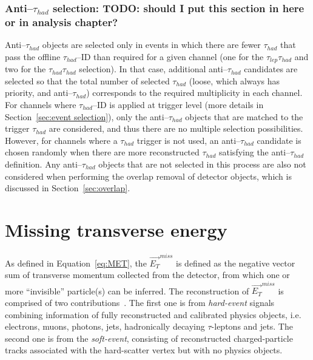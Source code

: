 \subsubsection{Anti--$\tau_{had}$ selection: TODO: should I put this section in here or in analysis chapter?}
Anti--$\tau_{had}$ objects are selected only in events 
in which there are fewer $\tau_{had}$ that pass the offline $\tau_{had}$--ID than
required for a given channel (one for the $\tau_{lep}\tau_{had}$ 
and two for the $\tau_{had}$$\tau_{had}$ selection). 
In that case, additional anti--$\tau_{had}$ candidates are selected 
so that the total number of selected $\tau_{had}$ (loose, which always has priority,
and anti--$\tau_{had}$) corresponds to the required multiplicity in each channel.
For channels where $\tau_{had}$--ID is applied at trigger level 
(more details in Section~\ref{sec:event selection}), 
only the anti--$\tau_{had}$ objects that are matched to the
trigger $\tau_{had}$ are considered, and thus there are 
no multiple selection possibilities. 
However, for channels where a $\tau_{had}$ trigger is not used, 
an anti--$\tau_{had}$ candidate is chosen randomly when there are more reconstructed
$\tau_{had}$ satisfying the anti--$\tau_{had}$ definition. 
Any anti--$\tau_{had}$ objects that are not selected in this process are also not
considered when performing the overlap removal of detector objects, 
which is discussed in Section~\ref{sec:overlap}.

\section{Missing transverse energy}
As defined in Equation~\ref{eq:MET}, the $\vec{E_T}^{miss}$ is defined 
as the negative vector sum of transverse momentum collected from the 
detector, from which one or more ``invisible'' particle(s) can be inferred. 
The reconstruction of $\vec{E_T}^{miss}$ is comprised of two contributions~\cite{MET2018}. 
The first one is from \textit{hard-event} signals combining 
information of fully reconstructed and calibrated 
physics objects, i.e. electrons, muons, photons, jets,
hadronically decaying $\tau$-leptons and jets. 
The second one is from the \textit{soft-event}, consisting of 
reconstructed charged-particle tracks associated with the hard-scatter
vertex but with no physics objects.

